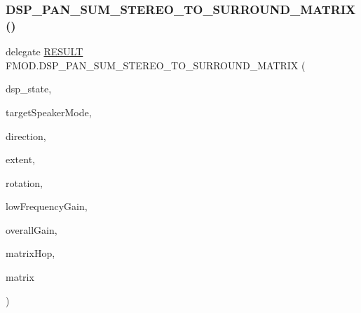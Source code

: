 \subsubsection{\texorpdfstring{D\+S\+P\+\_\+\+P\+A\+N\+\_\+\+S\+U\+M\+\_\+\+S\+T\+E\+R\+E\+O\+\_\+\+T\+O\+\_\+\+S\+U\+R\+R\+O\+U\+N\+D\+\_\+\+M\+A\+T\+R\+I\+X()}{DSP\_PAN\_SUM\_STEREO\_TO\_SURROUND\_MATRIX()}}
{\footnotesize\ttfamily delegate \hyperlink{namespace_f_m_o_d_a305d1176ef3f8c8815861a60407ac33d}{R\+E\+S\+U\+LT} F\+M\+O\+D.\+D\+S\+P\+\_\+\+P\+A\+N\+\_\+\+S\+U\+M\+\_\+\+S\+T\+E\+R\+E\+O\+\_\+\+T\+O\+\_\+\+S\+U\+R\+R\+O\+U\+N\+D\+\_\+\+M\+A\+T\+R\+IX (\begin{DoxyParamCaption}\item[{ref \hyperlink{struct_f_m_o_d_1_1_d_s_p___s_t_a_t_e}{D\+S\+P\+\_\+\+S\+T\+A\+TE}}]{dsp\+\_\+state,  }\item[{int}]{target\+Speaker\+Mode,  }\item[{float}]{direction,  }\item[{float}]{extent,  }\item[{float}]{rotation,  }\item[{float}]{low\+Frequency\+Gain,  }\item[{float}]{overall\+Gain,  }\item[{int}]{matrix\+Hop,  }\item[{Int\+Ptr}]{matrix }\end{DoxyParamCaption})}

\mbox{\label{namespace_f_m_o_d_a9dda121ba9ef7b93f94aae821fafc709}} 
